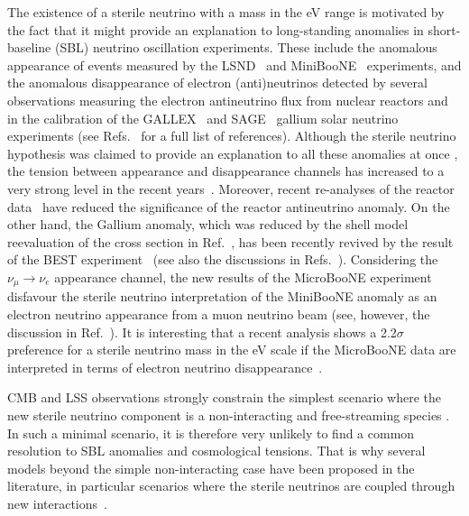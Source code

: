 \documentclass[a4paper,11pt]{article}
\begin{document}
The existence of a sterile neutrino {with a mass in the eV range} is motivated by the fact that it might provide an explanation to long-standing anomalies in short-baseline (SBL) neutrino oscillation experiments.
{These include the anomalous appearance of events measured by} the LSND~\cite{LSND:2001aii} and MiniBooNE~\cite{MiniBooNE:2018esg, MiniBooNE:2020pnu} experiments,
{and the anomalous disappearance of electron (anti)neutrinos detected} by several observations measuring the electron antineutrino flux from nuclear reactors \cite{Mention:2011rk} and in the calibration of the GALLEX~\cite{Kaether:2010ag} and SAGE~\cite{SAGE:2009eeu} gallium solar neutrino experiments \cite{Giunti:2006bj,Giunti:2010zu}
(see Refs.\ \cite{Gariazzo:2015rra,Boser:2019rta,Giunti:2019aiy} for a full list of references).
Although the sterile neutrino hypothesis was claimed to provide an explanation to all these anomalies at once \cite{Kopp:2013vaa,Gariazzo:2015rra},
the tension between appearance and disappearance channels
has increased to a very strong level in the recent years~\cite{Dentler:2018sju,Gariazzo:2017fdh,Diaz:2019fwt}.
Moreover, recent re-analyses of the reactor data~\cite{Berryman:2020agd,Giunti:2021kab}
have reduced the significance of the reactor antineutrino anomaly.
On the other hand,
the Gallium anomaly,
which was reduced by the shell model reevaluation of the cross section in Ref.~\cite{Kostensalo:2019vmv},
has been recently revived by the result of the BEST experiment~\cite{Barinov:2021asz}
(see also the discussions in Refs.~\cite{Barinov:2021mjj,Giunti:2021kab,Berryman:2021yan}).
Considering the $\nu_\mu\to\nu_e$ appearance channel,
the new results of the MicroBooNE experiment \cite{MicroBooNE:2021jwr,MicroBooNE:2021nxr,MicroBooNE:2021rmx}
disfavour the sterile neutrino interpretation of the MiniBooNE anomaly as an electron neutrino appearance from a muon neutrino beam
(see, however, the discussion in Ref.~\cite{Arguelles:2021meu}).
It is interesting that a recent analysis shows a 2.2$\sigma$ preference for a sterile neutrino mass in the eV scale if the MicroBooNE data are interpreted in terms of electron neutrino disappearance~\cite{Denton:2021czb}. 

CMB and LSS observations strongly constrain the simplest scenario where the new sterile neutrino component is a non-interacting and free-streaming species \cite{Gariazzo:2019gyi,Hagstotz:2020ukm,Gariazzo:2018zho,Gariazzo:2016ehl,Gariazzo:2015rra}.
In such a minimal scenario, it is therefore very unlikely to find a common resolution to SBL anomalies and cosmological tensions.
That is why several models beyond the simple non-interacting case have been proposed in the literature, in particular scenarios where the sterile neutrinos are coupled through new interactions~\cite{Dasgupta:2013zpn,Hannestad:2013ana,Archidiacono:2014nda,Kreisch:2019yzn}.
\end{document}
